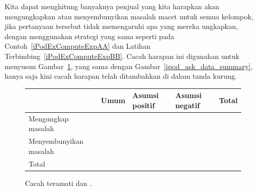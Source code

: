 Kita dapat menghitung banyaknya penjual yang kita harapkan
akan mengungkapkan atau menyembunyikan masalah macet untuk semua kelompok,
jika pertanyaan tersebut tidak memengaruhi apa yang mereka ungkapkan,
dengan menggunakan strategi yang sama seperti pada
Contoh~\ref{iPodExComputeExpAA} dan
Latihan Terbimbing~\ref{iPodExComputeExpBB}.
Cacah harapan ini digunakan untuk menyusun Gambar~\ref{ipod_ask_data_summary_expected},
yang sama dengan Gambar~\ref{ipod_ask_data_summary},
hanya saja kini cacah harapan telah ditambahkan di dalam tanda kurung.

\begin{figure}[h]
\centering
\begin{tabular}{l lll l}
  \hline
  & Umum & Asumsi positif &
      Asumsi negatif & Total \\ 
  \hline
  Mengungkap masalah &
      \iPodAA{} \ \highlightO{\footnotesize(\iPodAExpected{})} &
      \iPodAB{} \highlightO{\footnotesize(\iPodAExpected{})} &
      \iPodAC{} \highlightO{\footnotesize(\iPodAExpected{})} &
      \iPodAD{} \\ 
  Menyembunyikan masalah &
      \iPodBA{} \highlightO{\footnotesize(\iPodBExpected{})} &
      \iPodBB{} \highlightO{\footnotesize(\iPodBExpected{})} &
      \iPodBC{} \highlightO{\footnotesize(\iPodBExpected{})} &
      \iPodBD{} \\ 
  \hline
  Total & \iPodDA{} & \iPodDB{} &
      \iPodDC{} & \iPodDD{} \\
  \hline
\end{tabular}
\caption{Cacah teramati dan
    .}
\label{ipod_ask_data_summary_expected}
\end{figure}

